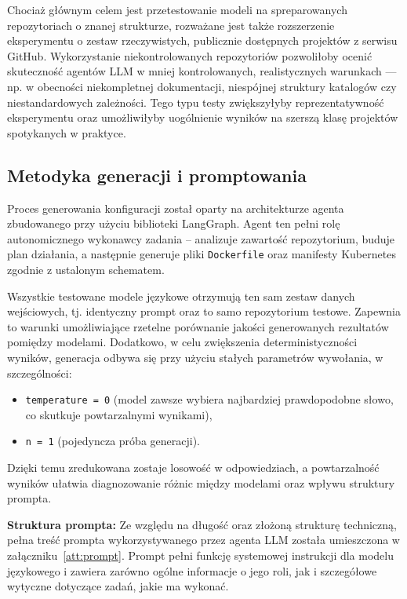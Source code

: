 \bigskip
Chociaż głównym celem jest przetestowanie modeli na spreparowanych repozytoriach o znanej strukturze, rozważane jest także rozszerzenie eksperymentu o zestaw rzeczywistych, publicznie dostępnych projektów z serwisu GitHub. Wykorzystanie niekontrolowanych repozytoriów pozwoliłoby ocenić skuteczność agentów LLM w mniej kontrolowanych, realistycznych warunkach — np. w obecności niekompletnej dokumentacji, niespójnej struktury katalogów czy niestandardowych zależności. Tego typu testy zwiększyłyby reprezentatywność eksperymentu oraz umożliwiłyby uogólnienie wyników na szerszą klasę projektów spotykanych w praktyce.

\subsection{Metodyka generacji i promptowania}

Proces generowania konfiguracji został oparty na architekturze agenta zbudowanego przy użyciu biblioteki LangGraph. Agent ten pełni rolę autonomicznego wykonawcy zadania – analizuje zawartość repozytorium, buduje plan działania, a następnie generuje pliki \texttt{Dockerfile} oraz manifesty Kubernetes zgodnie z ustalonym schematem.

Wszystkie testowane modele językowe otrzymują ten sam zestaw danych wejściowych, tj. identyczny prompt oraz to samo repozytorium testowe. Zapewnia to warunki umożliwiające rzetelne porównanie jakości generowanych rezultatów pomiędzy modelami. Dodatkowo, w celu zwiększenia deterministyczności wyników, generacja odbywa się przy użyciu stałych parametrów wywołania, w szczególności:
\begin{itemize}
    \item \texttt{temperature = 0} (model zawsze wybiera najbardziej prawdopodobne słowo, co skutkuje powtarzalnymi wynikami),
    \item \texttt{n = 1} (pojedyncza próba generacji).
\end{itemize}

Dzięki temu zredukowana zostaje losowość w odpowiedziach, a powtarzalność wyników ułatwia diagnozowanie różnic między modelami oraz wpływu struktury prompta.

\bigskip
\noindent
\textbf{Struktura prompta:}  
Ze względu na długość oraz złożoną strukturę techniczną, pełna treść prompta wykorzystywanego przez agenta LLM została umieszczona w załączniku~\ref{att:prompt}. Prompt pełni funkcję systemowej instrukcji dla modelu językowego i zawiera zarówno ogólne informacje o jego roli, jak i szczegółowe wytyczne dotyczące zadań, jakie ma wykonać.

